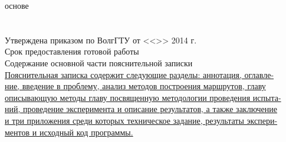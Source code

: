 \begin{titlepage}
{{        основе\hspace{1.7em}}}\\
    \vspace{0.5em}\hspace*{12mm}\underline{}\\
    \vspace{0.5em}\hspace*{12mm}\underline{\hspace{0.93\textwidth}}\\
    \vspace{1em}Утверждена приказом по ВолгГТУ от <<\underline{}>> \underline{}
        2014 г. \textnumero \underline{\hspace{3em}}\\
    Срок предоставления готовой работы \\
    \vspace{0.5em}Содержание основной части пояснительной записки\\
    \underline{Пояснительная записка содержит следующие разделы: аннотация, оглавле-}\\
    \underline{ние, введение в проблему, анализ методов построения маршрутов, главу\hspace{1.8em}}\\
    \underline{описывающую методы главу посвященную методологии проведения испыта-}\\
    \underline{ний, проведение эксперимента и описание результатов, а также заключение}\\
    \underline{и три приложения среди которых техническое задание, результаты экспери-}\\
    \underline{ментов и исходный код программы.\hspace{18.8em}}
    \\\LINE{\textwidth}\\\LINE{\textwidth}\\\LINE{\textwidth}\\\LINE{\textwidth}\\\LINE{\textwidth}\\
    \LINE{\textwidth}\\\LINE{\textwidth}\\\LINE{\textwidth}\\\LINE{\textwidth}
    \newpage
    \thispagestyle{empty}

\end{titlepage}
